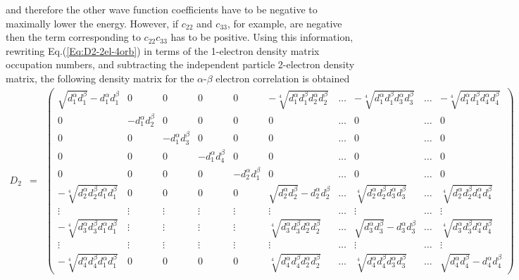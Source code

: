 \documentclass[aip,graphicx]{revtex4-1}
\newcommand{\dq}[2]{d_{#1}^{#2}}
\newcommand{\da}[1]{\dq{#1}{\alpha}}
\newcommand{\db}[1]{\dq{#1}{\beta}}
\begin{document}
\begin{itemize}
         and therefore the other wave function coefficients have to be negative to maximally lower the energy. 
         However, if $c_{22}$ and $c_{33}$, for example, are negative then the term corresponding to
         $c_{22}c_{33}$ has to be positive. Using this information, rewriting Eq.(\ref{Eq:D2-2el-4orb}) in terms of 
         the 1-electron density matrix occupation numbers, and subtracting the independent particle 2-electron density
         matrix, the following density matrix for the $\alpha$-$\beta$ electron correlation is obtained
         \tiny
         \begin{eqnarray}
         \label{Eq:Ecorrelation-2el-4orb}
         D_{2} &=&
         \begin{pmatrix}
         \sqrt{\da{1}\db{1}} -  \da{1}\db{1} & 0 & 0 & 0 & 0 & -\sqrt[4]{\da{1}\db{1}\da{2}\db{2}} & \ldots & -\sqrt[4]{\da{1}\db{1}\da{3}\db{3}} & \ldots & -\sqrt[4]{\da{1}\db{1}\da{4}\db{4}}  \\
         0 & -\da{1}\db{2} & 0 & 0 &  0 & 0 & \ldots & 0 & \ldots & 0 \\
         0 & 0 & -\da{1}\db{3} & 0 &  0 & 0 & \ldots & 0 & \ldots & 0 \\
         0 & 0 & 0 & -\da{1}\db{4} &  0 & 0 & \ldots & 0 & \ldots & 0 \\
         0 & 0 & 0 & 0 &  -\da{2}\db{1} & 0 & \ldots & 0 & \ldots & 0 \\
         -\sqrt[4]{\da{2}\db{2}\da{1}\db{1}}  & 0 & 0 & 0 & 0 & \sqrt{\da{2}\db{2}} -  \da{2}\db{2}  & \ldots & \sqrt[4]{\da{2}\db{2}\da{3}\db{3}} & \ldots & \sqrt[4]{\da{2}\db{2}\da{4}\db{4}} \\
         \vdots & \vdots & \vdots & \vdots &  \vdots & \vdots & \ldots & \vdots & \ldots & \vdots \\
         -\sqrt[4]{\da{3}\db{3}\da{1}\db{1}} & \vdots & \vdots & \vdots &  \vdots & \sqrt[4]{\da{3}\db{3}\da{2}\db{2}} & \ldots & \sqrt{\da{3}\db{3}} -  \da{3}\db{3}  & \ldots & \sqrt[4]{\da{3}\db{3}\da{4}\db{4}} \\
         \vdots & \vdots & \vdots & \vdots &  \vdots & \vdots & \ldots & \vdots & \ldots & \vdots \\
         -\sqrt[4]{\da{4}\db{4}\da{1}\db{1}} & 0 & 0 & 0 & 0 & \sqrt[4]{\da{4}\db{4}\da{2}\db{2}} & \ldots & \sqrt[4]{\da{4}\db{4}\da{3}\db{3}} & \ldots& \sqrt{\da{4}\db{4}} -  \da{4}\db{4} 
         \end{pmatrix}
         \end{eqnarray}
         \normalsize
\end{itemize}
\end{document}

